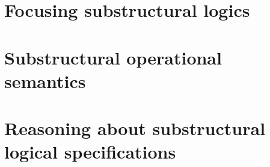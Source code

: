 \documentclass[12pt]{cmuthesis}
\begin{document}


\part{Focusing substructural logics}







\part{Substructural operational semantics}









\part{Reasoning about substructural logical specifications}







\appendix







\end{document}
